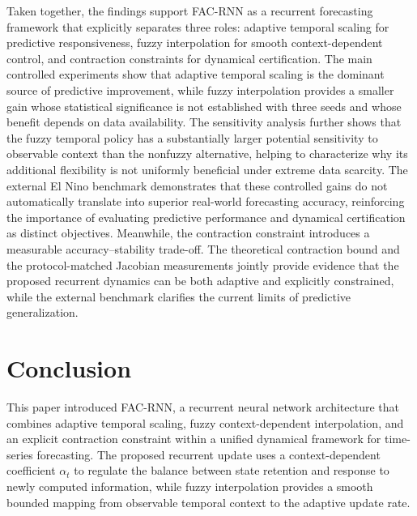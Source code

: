 \documentclass[journal]{IEEEtran}
\begin{document}
	Taken together, the findings support FAC-RNN as a recurrent forecasting framework that explicitly separates three roles: adaptive temporal scaling for predictive responsiveness, fuzzy interpolation for smooth context-dependent control, and contraction constraints for dynamical certification. The main controlled experiments show that adaptive temporal scaling is the dominant source of predictive improvement, while fuzzy interpolation provides a smaller gain whose statistical significance is not established with three seeds and whose benefit depends on data availability. The sensitivity analysis further shows that the fuzzy temporal policy has a substantially larger potential sensitivity to observable context than the nonfuzzy alternative, helping to characterize why its additional flexibility is not uniformly beneficial under extreme data scarcity. The external El Nino benchmark demonstrates that these controlled gains do not automatically translate into superior real-world forecasting accuracy, reinforcing the importance of evaluating predictive performance and dynamical certification as distinct objectives. Meanwhile, the contraction constraint introduces a measurable accuracy--stability trade-off. The theoretical contraction bound and the protocol-matched Jacobian measurements jointly provide evidence that the proposed recurrent dynamics can be both adaptive and explicitly constrained, while the external benchmark clarifies the current limits of predictive generalization.



	
	\section{Conclusion}
	\label{sec:conclusion}
	
	This paper introduced FAC-RNN, a recurrent neural network architecture that combines adaptive temporal scaling, fuzzy context-dependent interpolation, and an explicit contraction constraint within a unified dynamical framework for time-series forecasting. The proposed recurrent update uses a context-dependent coefficient $\alpha_t$ to regulate the balance between state retention and response to newly computed information, while fuzzy interpolation provides a smooth bounded mapping from observable temporal context to the adaptive update rate.
	
\end{document}
